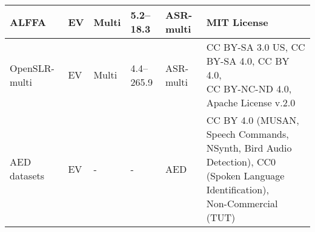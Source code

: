 \begin{table*}[ht]
{\begin{tabular}{llllll}
    ALFFA & EV & Multi & 5.2--18.3 & ASR-multi & MIT License \\ \hline %
    OpenSLR-multi & EV & Multi & 4.4--265.9 & ASR-multi & \makecell[l]{CC BY-SA 3.0 US, CC BY-SA 4.0, CC BY 4.0, \\ CC BY-NC-ND 4.0, Apache License v.2.0}\\ \hline %
    AED datasets & EV & - & - & AED & \makecell[l]{CC BY 4.0 (MUSAN, Speech Commands, NSynth, Bird Audio\\ Detection),  CC0 (Spoken Language Identification),\\ Non-Commercial (TUT)} \\
    \bottomrule
  \end{tabular}}
\end{table*}


\addtocounter{footnote}{1}
\addtocounter{footnote}{1}
\addtocounter{footnote}{1}

